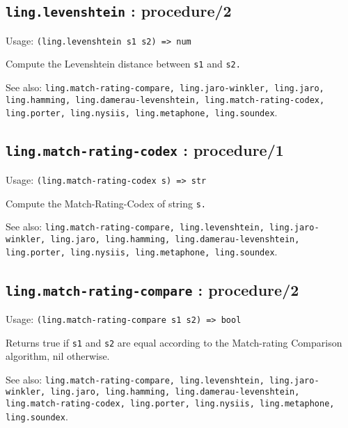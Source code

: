 \documentclass[
]{article}
\newcommand{\passthrough}[1]{#1}
\begin{document}
\hypertarget{ling.levenshtein-procedure2-1}{%
\subsection{\texorpdfstring{\texttt{ling.levenshtein} :
procedure/2}{ling.levenshtein : procedure/2}}\label{ling.levenshtein-procedure2-1}}

Usage: \passthrough{\lstinline!(ling.levenshtein s1 s2) => num!}

Compute the Levenshtein distance between \passthrough{\lstinline!s1!}
and \passthrough{\lstinline!s2.!}

See also:
\passthrough{\lstinline!ling.match-rating-compare, ling.jaro-winkler, ling.jaro, ling.hamming, ling.damerau-levenshtein, ling.match-rating-codex, ling.porter, ling.nysiis, ling.metaphone, ling.soundex!}.

\hypertarget{ling.match-rating-codex-procedure1-1}{%
\subsection{\texorpdfstring{\texttt{ling.match-rating-codex} :
procedure/1}{ling.match-rating-codex : procedure/1}}\label{ling.match-rating-codex-procedure1-1}}

Usage: \passthrough{\lstinline!(ling.match-rating-codex s) => str!}

Compute the Match-Rating-Codex of string \passthrough{\lstinline!s.!}

See also:
\passthrough{\lstinline!ling.match-rating-compare, ling.levenshtein, ling.jaro-winkler, ling.jaro, ling.hamming, ling.damerau-levenshtein, ling.porter, ling.nysiis, ling.metaphone, ling.soundex!}.

\hypertarget{ling.match-rating-compare-procedure2-1}{%
\subsection{\texorpdfstring{\texttt{ling.match-rating-compare} :
procedure/2}{ling.match-rating-compare : procedure/2}}\label{ling.match-rating-compare-procedure2-1}}

Usage:
\passthrough{\lstinline!(ling.match-rating-compare s1 s2) => bool!}

Returns true if \passthrough{\lstinline!s1!} and
\passthrough{\lstinline!s2!} are equal according to the Match-rating
Comparison algorithm, nil otherwise.

See also:
\passthrough{\lstinline!ling.match-rating-compare, ling.levenshtein, ling.jaro-winkler, ling.jaro, ling.hamming, ling.damerau-levenshtein, ling.match-rating-codex, ling.porter, ling.nysiis, ling.metaphone, ling.soundex!}.
\end{document}
